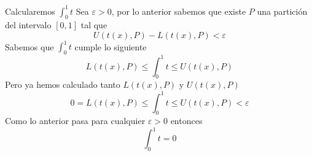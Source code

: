 \documentclass[a4paper]{article}
\begin{document}
Calcularemos \(\int_{0}^{1}t\)
\newline 
Sea \(\varepsilon > 0\), por lo anterior sabemos que existe \(P\) una partición del intervalo 
\([0, 1]\) tal que 
\[
    U\left(t(x), P\right) - L\left(t(x), P\right) < \varepsilon
\]
Sabemos que \(\int_{0}^{1} t\) cumple lo siguiente 
\[
    L\left(t(x), P\right) \leq \int_{0}^{1} t \leq U\left(t(x), P\right)
\]
Pero ya hemos calculado tanto \(L\left(t(x), P\right)\) y \(U\left(t(x), P\right)\)
\[
    0 = L\left(t(x), P\right) \leq \int_{0}^{1} t \leq U\left(t(x), P\right) < \varepsilon
\]
Como lo anterior pasa para cualquier \(\varepsilon > 0\) entonces 
\[
    \int_{0}^{1} t = 0
\]
\end{document}

